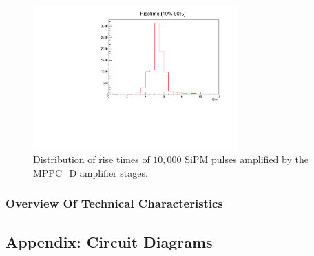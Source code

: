 \documentclass[]{article}
\begin{document}
	\begin{figure}[t]
		\centering
			\includegraphics[width=0.7\textwidth]{Figures/weinstock/old_amp_rise_time.pdf}
		\caption{Distribution of rise times of $10,000$ SiPM pulses amplified by the MPPC\_D amplifier stages.}
		\label{fig:rise_time_old}
	\end{figure}	

\subsubsection{Overview Of Technical Characteristics}

\subsection{Appendix: Circuit Diagrams}
\end{document}
